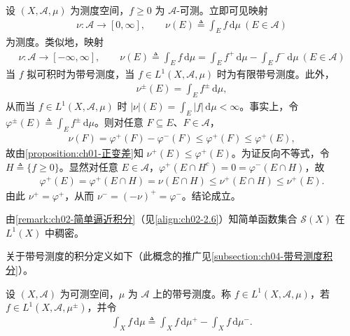 \documentclass[../../main.tex]{subfiles}%
\begin{document}
\begin{remark}\label{remark:ch02-测度密度}
设 $(X,\mathscr A,\mu)$ 为测度空间，$f\geqslant0$ 为 $\mathscr A$-可测。立即可见映射
\begin{align}
\nu:\mathscr A\to[0,\infty],\qquad \nu(E)\triangleq \int_E f\,\mathrm{d}\mu\ (E\in\mathscr A) \label{align:ch02-2.7}
\end{align}
为测度。类似地，映射
\begin{align}
\nu:\mathscr A\to[-\infty,\infty],\qquad \nu(E)\triangleq \int_E f\,\mathrm{d}\mu=\int_E f^+\,\mathrm{d}\mu-\int_E f^-\,\mathrm{d}\mu\ (E\in\mathscr A) \label{align:ch02-2.8}
\end{align}
当 $f$ 拟可积时为带号测度，当 $f\in L^1(X,\mathscr A,\mu)$ 时为有限带号测度。此外，
\begin{align}
\nu^\pm(E)=\int_E f^\pm\,\mathrm{d}\mu, \label{align:ch02-2.9}
\end{align}
从而当 $f\in L^1(X,\mathscr A,\mu)$ 时 $|\nu|(E)=\int_E|f|\,\mathrm{d}\mu<\infty$。事实上，令 $\varphi^\pm(E)\triangleq \int_E f^\pm\,\mathrm{d}\mu$。则对任意 $F\subseteq E$、$F\in\mathscr A$，
\begin{align*}
\nu(F)=\varphi^+(F)-\varphi^-(F)\leqslant\varphi^+(F)\leqslant\varphi^+(E),
\end{align*}
故由\cref{proposition:ch01-正变差}知 $\nu^+(E)\leqslant\varphi^+(E)$。为证反向不等式，令 $H\triangleq \{f\geqslant0\}$。显然对任意 $E\in\mathscr A$，$\varphi^+(E\cap H^c)=0=\varphi^-(E\cap H)$，故
\begin{align*}
\varphi^+(E)=\varphi^+(E\cap H)=\nu(E\cap H)\leqslant\nu^+(E\cap H)\leqslant\nu^+(E).
\end{align*}
由此 $\nu^+=\varphi^+$，从而 $\nu^-=(-\nu)^+=\varphi^-$。结论成立。
\end{remark}

\begin{remark}\label{remark:ch02-简单函数稠密}
由\cref{remark:ch02-简单逼近积分}（见\eqref{align:ch02-2.6}）知简单函数集合 $\mathscr S(X)$ 在 $L^1(X)$ 中稠密。
\end{remark}

关于带号测度的积分定义如下（此概念的推广见\cref{subsection:ch04-带号测度积分}）。

\begin{definition}\label{definition:ch02-带号测度积分}\label{definition:ch02-带号积分}
设 $(X,\mathscr A)$ 为可测空间，$\mu$ 为 $\mathscr A$ 上的带号测度。称 $f\in L^1(X,\mathscr A,\mu)$，若 $f\in L^1(X,\mathscr A,\mu^\pm)$，并令
\begin{align}
\int_X f\,\mathrm{d}\mu\triangleq \int_X f\,\mathrm{d}\mu^+-\int_X f\,\mathrm{d}\mu^-. \label{align:ch02-2.10}
\end{align}
\end{definition}
\end{document}
